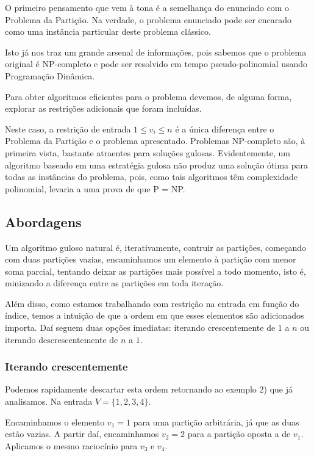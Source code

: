 O primeiro pensamento que vem à tona é a semelhança do enunciado com o Problema da Partição. Na verdade, o problema enunciado pode ser encarado como uma instância particular deste problema clássico.

Isto já nos traz um grande arsenal de informações, pois sabemos que o problema original é NP-completo \cite{karp1972reducibility} e pode ser resolvido em tempo pseudo-polinomial usando Programação Dinâmica.

Para obter algoritmos eficientes para o problema devemos, de alguma forma, explorar as restrições adicionais que foram incluídas.

Neste caso, a restrição de entrada $1 \leq v_i \leq n$ é a única diferença entre o Problema da Partição e o problema apresentado. 
Problemas NP-completo são, à primeira vista, bastante atraentes para soluções gulosas. Evidentemente, um algoritmo baseado em uma estratégia gulosa não produz uma solução ótima para todas as instâncias do problema, pois, como tais algoritmos têm complexidade polinomial, levaria a uma prova de que P = NP.

\subsection*{Abordagens}\label{particao:abordagem}

Um algoritmo guloso natural é, iterativamente, contruir as partições, começando com duas partições vazias, encaminhamos um elemento à partição com menor soma parcial, tentando deixar as partições mais  possível a todo momento, isto é, minizando a diferença entre as partições em toda iteração.

Além disso, como estamos trabalhando com restrição na entrada em função do índice, temos a intuição de que a ordem em que esses elementos são adicionados importa. Daí seguem duas opções imediatas: iterando crescentemente de $1$ a $n$ ou iterando descrescentemente de $n$ a $1$.

\subsubsection*{Iterando crescentemente}

Podemos rapidamente descartar esta ordem retornando ao exemplo 2) que já analisamos. Na entrada $V = \{1, 2, 3, 4\}$.

Encaminhamos o elemento $v_1 = 1$ para uma partição arbitrária, já que as duas estão vazias. A partir daí, encaminhamos $v_2 = 2$ para a partição oposta a de $v_1$. Aplicamos o mesmo raciocínio para $v_3$ e $v_4$.

